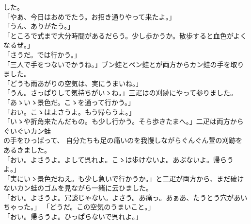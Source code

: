 \documentclass[
a4paper,
10pt,
book]
{tarticle}
\begin{document}
\begin{linenumbers}
    した。\\
    「やあ、今日はおめでたう。お招き通りやって来たよ。」\\
    「うん、ありがたう。」\\
    「ところで式まで大分時間があるだらう。少し歩かうか。散歩すると血色がよくなるぜ。」\\
    「さうだ。では行かう。」\\
    「三人で手をつないでかうね。」ブン蛙とベン蛙とが両方からカン蛙の手を取りました。\\
    「どうも雨あがりの空気は、実にうまいね。」\\
    「うん。さっぱりして気持ちがいゝね。」三疋はの刈跡にやって参りました。\\
    「あゝいゝ景色だ。こゝを通って行かう。」\\
    「おい。こゝはよさうよ。もう帰らうよ。」\\
    「いゝや折角来たんだもの。も少し行かう。そら歩きたまへ。」二疋は両方からぐいぐいカン蛙\\
    \indent の手をひっぱって、
    自分たちも足の痛いのを我慢しながらぐんぐん萱の刈跡をあるきました。\\
    「おい。よさうよ。よして呉れよ。こゝは歩けないよ。あぶないよ。帰らうよ。」\\
    「実にいゝ景色だねえ。も少し急いで行かうか。」と二疋が両方から、まだ破けないカン蛙のゴムを見ながら一緒に云ひました。\\
    「おい。よさうよ。冗談じゃない。よさう。あ痛っ。あぁあ、たうとう穴があいちゃった。」
    「どうだ。この空気のうまいこと。」\\
    「おい。帰らうよ。ひっぱらないで呉れよ。」
\end{linenumbers}
\end{document}
